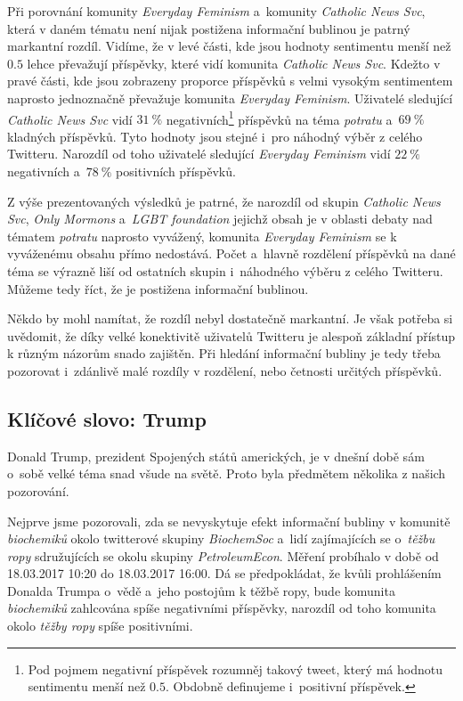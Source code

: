 \documentclass[12pt, a4paper]{article}
\numberwithin{equation}{section} 	%
\begin{document}
Při porovnání komunity \textit{Everyday Feminism} a~komunity \textit{Catholic News Svc}, která v daném tématu není nijak postižena informační bublinou je patrný markantní rozdíl. Vidíme, že v levé části, kde jsou hodnoty sentimentu menší než $0.5$ lehce převažují příspěvky, které vidí komunita \textit{Catholic News Svc}. Kdežto v pravé části, kde jsou zobrazeny proporce příspěvků s velmi vysokým sentimentem naprosto jednoznačně převažuje komunita \textit{Everyday Feminism}. Uživatelé sledující \textit{Catholic News Svc} vidí $31~\%$ negativních\footnote{Pod pojmem negativní příspěvek rozumněj takový tweet, který má hodnotu sentimentu menší než $0.5$. Obdobně definujeme i~positivní příspěvek.} příspěvků na téma \textit{potratu} a~$69~\%$ kladných příspěvků. Tyto hodnoty jsou stejné i~pro náhodný výběr z celého Twitteru. Narozdíl od toho uživatelé sledující \textit{Everyday Feminism} vidí $22~\%$ negativních a~$78~\%$ positivních příspěvků.

Z výše prezentovaných výsledků je patrné, že narozdíl od skupin \textit{Catholic News Svc}, \textit{Only Mormons} a~\textit{LGBT foundation} jejichž obsah je v oblasti debaty nad tématem \textit{potratu} naprosto vyvážený, komunita \textit{Everyday Feminism} se k vyváženému obsahu přímo nedostává. Počet a~hlavně rozdělení příspěvků na dané téma se výrazně liší od ostatních skupin i~náhodného výběru z celého Twitteru. Můžeme tedy říct, že je postižena informační bublinou.

Někdo by mohl namítat, že rozdíl nebyl dostatečně markantní. Je však potřeba si uvědomit, že díky velké konektivitě uživatelů Twitteru je alespoň základní přístup k různým názorům snado zajištěn. Při hledání informační bubliny je tedy třeba pozorovat i~zdánlivě malé rozdíly v rozdělení, nebo četnosti určitých příspěvků.

\subsection{Klíčové slovo: Trump}\label{subsec:Trump}
\noindent Donald Trump, prezident Spojených států amerických, je v dnešní době sám o~sobě velké téma snad všude na světě. Proto byla předmětem několika z našich pozorování.

Nejprve jsme pozorovali, zda se nevyskytuje efekt informační bubliny v komunitě \textit{biochemiků} okolo twitterové skupiny \textit{BiochemSoc} a~lidí zajímajících se o~\textit{těžbu ropy} sdružujících se okolu skupiny \textit{PetroleumEcon}. Měření probíhalo v době od 18.03.2017 10:20 do 18.03.2017 16:00. Dá se předpokládat, že kvůli prohlášením Donalda Trumpa o~vědě a~jeho postojům k těžbě ropy, bude komunita \textit{biochemiků} zahlcována spíše negativními příspěvky, narozdíl od toho komunita okolo \textit{těžby ropy} spíše positivními.
\end{document}
